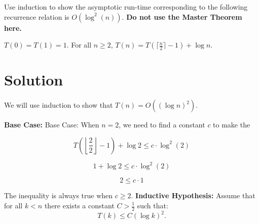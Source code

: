 \documentclass[11pt]{article}
\begin{document}
    \setlength{\headheight}{26pt}
    \pagestyle{fancy}
    \fancyfoot[C]{}
    \fancyfoot[R]{\thepage}
    \renewcommand{\headrulewidth}{0.4pt}
    \renewcommand{\footrulewidth}{0.4 pt}
    
	
    
    \begin{tcolorbox}[title={Problem 1A (Recurrence Relations — 3 Styles, 9 pts)}]
        Use induction to show the asymptotic run-time corresponding to the following recurrence relation is $O(\log^2(n))$. \textbf{Do not use the Master Theorem here.}
        \begin{center}
            $T(0) = T(1) = 1$. For all $n\geq 2$, $T(n) = T(\lceil\frac{n}{2}\rceil-1) + \log n$.
        \end{center}
    \end{tcolorbox}
    \section*{Solution}

        We will use induction to show that \( T(n)=O((\log n)^2) \).

        \textbf{Base Case:}  
        Base Case: When $n = 2$, we need to find a constant $c$ to make the

        \[
        T\left(\left\lfloor \frac{2}{2} \right\rfloor - 1\right) + \log 2 \leq c \cdot \log^2(2)
        \]

        \[
        1 + \log 2 \leq c \cdot \log^2(2)
        \]

        \[
        2 \leq c \cdot 1
        \]

        The inequality is always true when $c \geq 2$.
        \textbf{Inductive Hypothesis:}  
        Assume that for all \( k < n \) there exists a constant \( C > \frac{1}{2} \) such that:
        \[
        T(k) \le C (\log k)^2.
        \]
\end{document}
